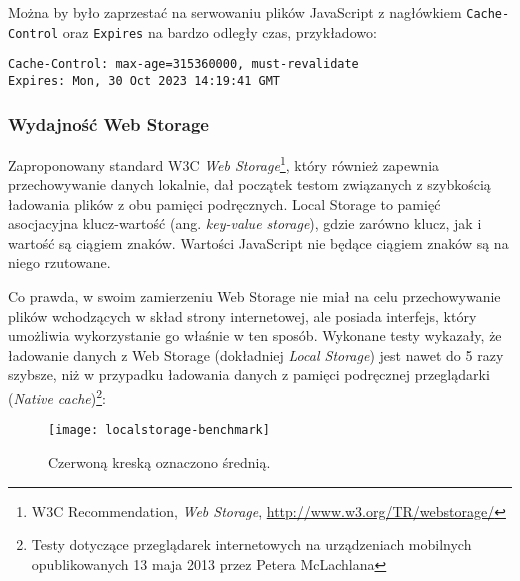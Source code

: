 Można by było zaprzestać na serwowaniu plików JavaScript z nagłówkiem \lstinline{Cache-Control} oraz \lstinline{Expires} na bardzo odległy czas, przykładowo:

\lstset{language=Octave}
\begin{lstlisting}
Cache-Control: max-age=315360000, must-revalidate
Expires: Mon, 30 Oct 2023 14:19:41 GMT
\end{lstlisting}

\subsubsection{Wydajność Web Storage}
\label{subsub:webstorage-performance}

Zaproponowany standard W3C \emph{Web Storage}\cite{webstorage}\footnote{W3C Recommendation, {\em Web Storage}, \url{http://www.w3.org/TR/webstorage/}}, który również zapewnia przechowywanie danych lokalnie, dał początek testom związanych z szybkością ładowania plików z obu pamięci podręcznych. Local Storage to pamięć asocjacyjna klucz-wartość (ang. \emph{key-value storage}), gdzie zarówno klucz, jak i wartość są ciągiem znaków. Wartości JavaScript nie będące ciągiem znaków są na niego rzutowane.

Co prawda, w swoim zamierzeniu Web Storage nie miał na celu przechowywanie plików wchodzących w skład strony internetowej, ale posiada interfejs, który umożliwia wykorzystanie go właśnie w ten sposób. Wykonane testy wykazały, że ładowanie danych z Web Storage (dokładniej \emph{Local Storage}) jest nawet do 5 razy szybsze, niż w przypadku ładowania danych z pamięci podręcznej przeglądarki (\emph{Native cache})\cite{http-cache-mobile-benchmark}\footnote{Testy dotyczące przeglądarek internetowych na urządzeniach mobilnych opublikowanych 13 maja 2013 przez Petera McLachlana}:

\begin{figure}[h!]
  \caption[Porównanie czasu ładowania danych z cache przeglądarki oraz Web Storage]{Czerwoną kreską oznaczono średnią.}
  \centering
    \texttt{[image: localstorage-benchmark]}
\end{figure}

